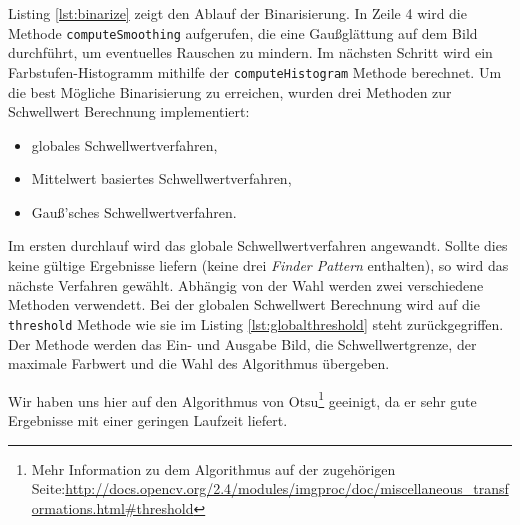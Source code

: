 Listing \ref{lst:binarize} zeigt den Ablauf der Binarisierung. In Zeile 4 wird die Methode \texttt{computeSmoothing} aufgerufen, die eine Gaußglättung auf dem Bild durchführt, um eventuelles Rauschen zu mindern. Im nächsten Schritt wird ein Farbstufen-Histogramm mithilfe der \texttt{computeHistogram} Methode berechnet. Um die best Mögliche Binarisierung zu erreichen, wurden drei Methoden zur Schwellwert Berechnung implementiert:
\begin{itemize}
	\item globales Schwellwertverfahren,
	\item Mittelwert basiertes Schwellwertverfahren,
	\item Gauß'sches Schwellwertverfahren.
\end{itemize} 
Im ersten durchlauf wird das globale Schwellwertverfahren angewandt. Sollte dies keine gültige Ergebnisse liefern (keine drei \emph{Finder Pattern} enthalten), so wird das nächste Verfahren gewählt.
Abhängig von der Wahl werden zwei verschiedene \OpenCV Methoden verwendett. Bei der globalen Schwellwert Berechnung wird auf die \texttt{threshold} Methode wie sie im Listing \ref{lst:globalthreshold} steht zurückgegriffen. Der Methode werden das Ein- und Ausgabe Bild, die Schwellwertgrenze, der maximale Farbwert und die Wahl des Algorithmus übergeben. 

Wir haben uns hier auf den Algorithmus von Otsu\footnote{Mehr Information zu dem Algorithmus auf der zugehörigen \OpenCV Seite:\url{http://docs.opencv.org/2.4/modules/imgproc/doc/miscellaneous_transformations.html\#threshold}} geeinigt, da er sehr gute Ergebnisse mit einer geringen Laufzeit liefert.

